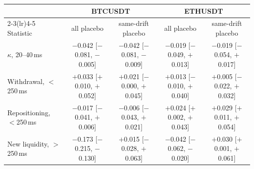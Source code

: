 \begin{tabular}{lcccc}
\toprule
 & \multicolumn{2}{c}{BTCUSDT} & \multicolumn{2}{c}{ETHUSDT} \\
\cmidrule(lr){2-3}\cmidrule(lr){4-5}
Statistic & all placebo & same-drift placebo & all placebo & same-drift placebo \\
\midrule
$\kappa$, 20--40\,ms & $-$0.042 [$-$0.081, $-$0.005] & $-$0.042 [$-$0.081, $-$0.009] & $-$0.019 [$-$0.049, $+$0.013] & $-$0.019 [$-$0.054, $+$0.017] \\
Withdrawal, $<$250\,ms & $+$0.033 [$+$0.010, $+$0.052] & $+$0.021 [$-$0.000, $+$0.045] & $+$0.013 [$-$0.010, $+$0.040] & $+$0.005 [$-$0.022, $+$0.032] \\
Repositioning, $<$250\,ms & $-$0.017 [$-$0.041, $+$0.006] & $-$0.006 [$-$0.043, $+$0.021] & $+$0.024 [$+$0.002, $+$0.043] & $+$0.029 [$+$0.011, $+$0.054] \\
New liquidity, $>$250\,ms & $-$0.173 [$-$0.215, $-$0.130] & $+$0.015 [$-$0.028, $+$0.063] & $-$0.042 [$-$0.062, $-$0.020] & $+$0.030 [$+$0.001, $+$0.061] \\
\bottomrule
\end{tabular}
